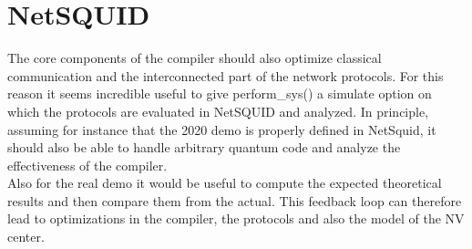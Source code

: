\documentclass[]{article}
\begin{document}
\section{NetSQUID}
The core components of the compiler should also optimize classical communication and the interconnected part of the network protocols. For this reason it seems incredible useful to give perform\_sys() a simulate option on which the protocols are evaluated in NetSQUID and analyzed. In principle, assuming for instance that the 2020 demo is properly defined in NetSquid, it should also be able to handle arbitrary quantum code and analyze the effectiveness of the compiler.\\
Also for the real demo it would be useful to compute the expected theoretical results and then compare them from the actual. This feedback loop can therefore lead to optimizations in the compiler, the protocols and also the model of the NV center.
\end{document}

